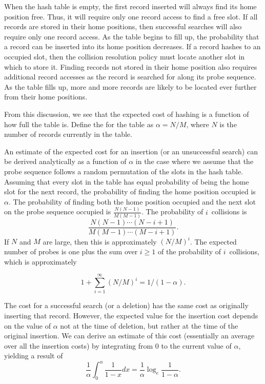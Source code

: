When the hash table is empty, the first record inserted will always
find its home position free.
Thus, it will require only one record access to find a free slot.
If all records are stored in their home positions, then successful
searches will also require only one record access.
As the table begins to fill up, the probability that a record can be
inserted into its home position decreases.
If a record hashes to an occupied slot, then the collision resolution
policy must locate another slot in which to store it.
Finding records not stored in their home position also requires
additional record accesses as the record is searched for along its probe
sequence.
As the table fills up, more and more records are likely to be located
ever further from their home positions.

From this discussion, we see that the expected cost of hashing is a
function of how full the table is.
Define the 
for the table as \(\alpha = N/M\),
where \(N\) is the number of records currently in the table.

An estimate of the expected cost for an insertion (or an unsuccessful
search) can be derived analytically as a function of \(\alpha\) in the
case where we assume that the probe sequence follows a random
permutation of the slots in the hash
table.
Assuming that every slot in the table has equal probability of being
the home slot for the next record,
the probability of finding the home position occupied is
\(\alpha\).
The probability of finding both the home position occupied and the
next slot on the probe sequence occupied is \(\frac{N(N-1)}{M(M-1)}\).
The probability of \(i\)~collisions is
\[ \frac{N(N-1) \cdots (N-i+1)}{M(M-1) \cdots (M-i+1)}. \]
If \(N\) and \(M\) are large, then this is approximately \((N/M)^i\).
The expected number of probes is one plus the sum over \(i \geq 1\) of
the probability of \(i\)~collisions, which is approximately

\[ 1 + \sum_{i=1}^\infty(N/M)^i = 1/(1-\alpha). \]

The cost for a successful search (or a deletion) has the same cost as
originally inserting that record.
However, the expected value for the insertion cost depends on the
value of \(\alpha\) not at the time of deletion, but rather at the time
of the original insertion.
We can derive an estimate of this cost (essentially an average over all
the insertion costs) by integrating from 0 to the current value of
\(\alpha\), yielding a result of
\[ \frac{1}{\alpha} \int_0^\alpha \frac{1}{1-x} dx =
   \frac{1}{\alpha} \log_e \frac{1}{1-\alpha}. \]

